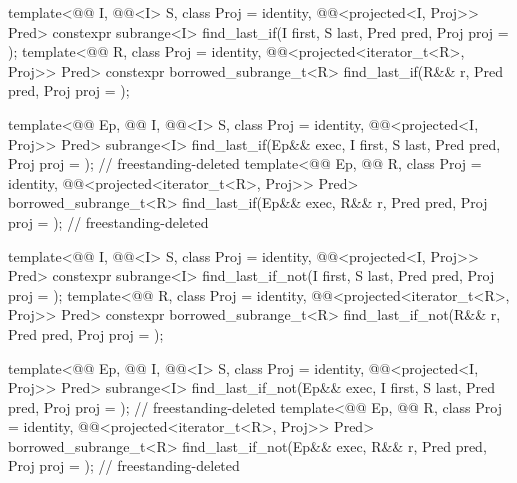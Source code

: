 \begin{codeblock}
{{    template<@@ I, @@<I> S, class Proj = identity,
             @@<projected<I, Proj>> Pred>
      constexpr subrange<I> find_last_if(I first, S last, Pred pred, Proj proj = {});
    template<@@ R, class Proj = identity,
             @@<projected<iterator_t<R>, Proj>> Pred>
      constexpr borrowed_subrange_t<R> find_last_if(R&& r, Pred pred, Proj proj = {});

    template<@@ Ep, @@ I, @@<I> S,
             class Proj = identity, @@<projected<I, Proj>> Pred>
      subrange<I>
        find_last_if(Ep&& exec, I first, S last, Pred pred,
                     Proj proj = {});                                       // freestanding-deleted
    template<@@ Ep, @@ R,
             class Proj = identity,
             @@<projected<iterator_t<R>, Proj>> Pred>
      borrowed_subrange_t<R>
        find_last_if(Ep&& exec, R&& r, Pred pred, Proj proj = {});          // freestanding-deleted

    template<@@ I, @@<I> S, class Proj = identity,
             @@<projected<I, Proj>> Pred>
      constexpr subrange<I> find_last_if_not(I first, S last, Pred pred, Proj proj = {});
    template<@@ R, class Proj = identity,
             @@<projected<iterator_t<R>, Proj>> Pred>
      constexpr borrowed_subrange_t<R> find_last_if_not(R&& r, Pred pred, Proj proj = {});

    template<@@ Ep, @@ I, @@<I> S,
             class Proj = identity,
             @@<projected<I, Proj>> Pred>
      subrange<I>
        find_last_if_not(Ep&& exec, I first, S last, Pred pred,
                         Proj proj = {});                                   // freestanding-deleted
    template<@@ Ep, @@ R, class Proj = identity,
             @@<projected<iterator_t<R>, Proj>> Pred>
      borrowed_subrange_t<R>
        find_last_if_not(Ep&& exec, R&& r, Pred pred, Proj proj = {});      // freestanding-deleted
  }

}
\end{codeblock}
